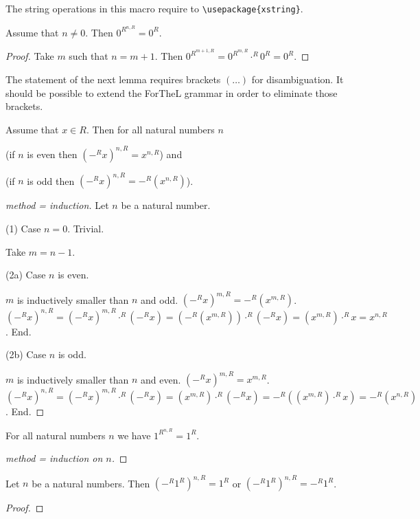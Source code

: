 \documentclass[11pt]{article}
\begin{document}
\noindent The string operations in this macro require to 
\verb|\usepackage{xstring}|.

\begin{forthel}
\begin{lemma} Assume that $n \neq 0$. Then $0^{R}^{n,R} = 0^{R}$. \end{lemma}
\begin{proof}
Take $m$ such that
$n = m + 1$. Then $0^{R}^{m+1,R} = 0^{R}^{m,R} \cdot^{R} 0^{R}
= 0^{R}$.
\end{proof}
\end{forthel}
%
The statement of the next lemma requires brackets $(\dots)$ for
disambiguation. It should be possible to extend the ForTheL grammar in
order to eliminate those brackets.
%
\begin{forthel}
\begin{lemma}
Assume that $x \in R$. Then for all natural numbers $n$

(if $n$ is even then $(-^{R}x)^{n,R} = x^{n,R}$)
and 

(if $n$ is odd then $(-^{R}x)^{n,R} = -^{R}(x^{n,R})$).
\end{lemma}
\begin{proof}[method = induction]
Let $n$ be a natural number.

(1) Case $n = 0$. Trivial.

Take $m = n - 1$.

(2a) Case $n$ is even. 

$m$ is inductively smaller than $n$ and odd.
$(-^{R}x)^{m,R} = -^{R}(x^{m,R})$.
$(-^{R}x)^{n,R} = (-^{R}x)^{m,R} \cdot^{R} (-^{R}x) = (-^{R}(x^{m,R})) \cdot^{R} (-^{R}x)
= (x^{m,R}) \cdot^{R} x = x^{n,R}$.
End.

(2b) Case $n$ is odd. 

$m$ is inductively smaller than $n$ and even.
$(-^{R}x)^{m,R} = x^{m,R}$.
$(-^{R}x)^{n,R} = (-^{R}x)^{m,R} \cdot^{R} (-^{R}x) = (x^{m,R}) \cdot^{R} (-^{R}x)
= -^{R} ((x^{m,R}) \cdot^{R} x) = -^{R}(x^{n,R})$.
End.

\end{proof}

\begin{lemma} For all natural numbers $n$ we have $1^{R}^{n,R} = 1^{R}$. \end{lemma}
\begin{proof}[method = induction on $n$]
\end{proof}

\begin{lemma} Let $n$ be a natural numbers. Then $(-^{R} 1^{R})^{n,R} = 1^{R}$
or $(-^{R} 1^{R})^{n,R} = -^{R} 1^{R}$. 
\end{lemma}
\begin{proof}
\end{proof}


\end{forthel}
\end{document}
